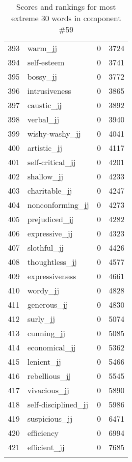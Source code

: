 \begin{longtable}[!htbp]{| rlr@{.}l |}
    393 & warm\_jj & 0 & 3724 \\
    394 & self-esteem & 0 & 3741 \\
    395 & bossy\_jj & 0 & 3772 \\
    396 & intrusiveness & 0 & 3865 \\
    397 & caustic\_jj & 0 & 3892 \\
    398 & verbal\_jj & 0 & 3940 \\
    399 & wishy-washy\_jj & 0 & 4041 \\
    400 & artistic\_jj & 0 & 4117 \\
    401 & self-critical\_jj & 0 & 4201 \\
    402 & shallow\_jj & 0 & 4233 \\
    403 & charitable\_jj & 0 & 4247 \\
    404 & nonconforming\_jj & 0 & 4273 \\
    405 & prejudiced\_jj & 0 & 4282 \\
    406 & expressive\_jj & 0 & 4323 \\
    407 & slothful\_jj & 0 & 4426 \\
    408 & thoughtless\_jj & 0 & 4577 \\
    409 & expressiveness & 0 & 4661 \\
    410 & wordy\_jj & 0 & 4828 \\
    411 & generous\_jj & 0 & 4830 \\
    412 & surly\_jj & 0 & 5074 \\
    413 & cunning\_jj & 0 & 5085 \\
    414 & economical\_jj & 0 & 5362 \\
    415 & lenient\_jj & 0 & 5466 \\
    416 & rebellious\_jj & 0 & 5545 \\
    417 & vivacious\_jj & 0 & 5890 \\
    418 & self-disciplined\_jj & 0 & 5986 \\
    419 & suspicious\_jj & 0 & 6471 \\
    420 & efficiency & 0 & 6994 \\
    421 & efficient\_jj & 0 & 7685 \\
    \hline
    \caption{Scores and rankings for most extreme 30 words in component \#59} \\
\end{longtable}
